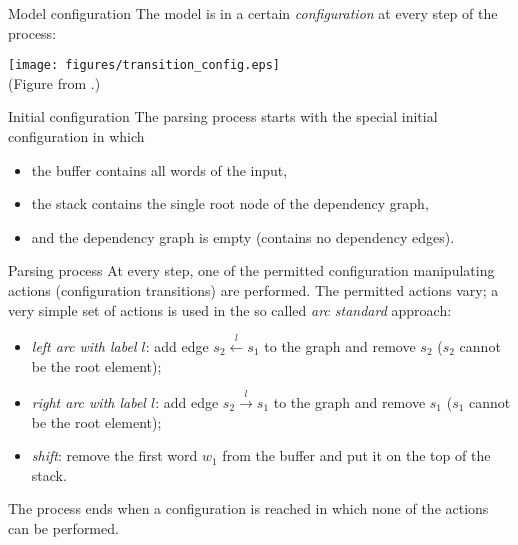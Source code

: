 \documentclass[style=upen, size=14pt]{powerdot}
\newcommand{\gold}{\color{arany}}
\theoremstyle{definition}
\begin{document}
\begin{slide}[toc=Configurations]{Model configuration}
  The model is in a certain \emph{\gold configuration} at every step of the
  process:
  \begin{center}
    \texttt{[image: figures/transition\_config.eps]}\\
    \footnotesize{(Figure from \citet[ch. 15]{jurafsky2019speech}.)}
  \end{center}
\end{slide}

\begin{slide}[toc=Initial config]{Initial configuration}
  The parsing process starts with the special initial configuration in which
  \begin{itemize}
  \item the buffer contains all words of the input,
  \item the stack contains the single root node of the dependency graph,
  \item and the dependency graph is empty (contains no dependency edges).
  \end{itemize}
\end{slide}

\begin{slide}[toc=Parsing process]{Parsing process}
  At every step, one of the permitted configuration manipulating actions
  (configuration transitions) are performed. The permitted actions vary; a very
  simple set of actions is used in the so called \emph{\gold arc standard}
  approach:
  \begin{itemize}
  \item \emph{\gold left arc with label $l$}: add edge $s_2\xleftarrow{l} s_1$
    to the graph and remove $s_2$ ($s_2$ cannot be the root element);
  \item \emph{\gold right arc with label $l$}: add edge $s_2\xrightarrow{l} s_1$
    to the graph and remove $s_1$ ($s_1$ cannot be the root element);
  \item \emph{\gold shift}: remove the first word $w_1$ from the buffer and put
    it on the top of the stack.
  \end{itemize}
  The process ends when a configuration is reached in which none of the actions
  can be performed.
\end{slide}
\end{document}

